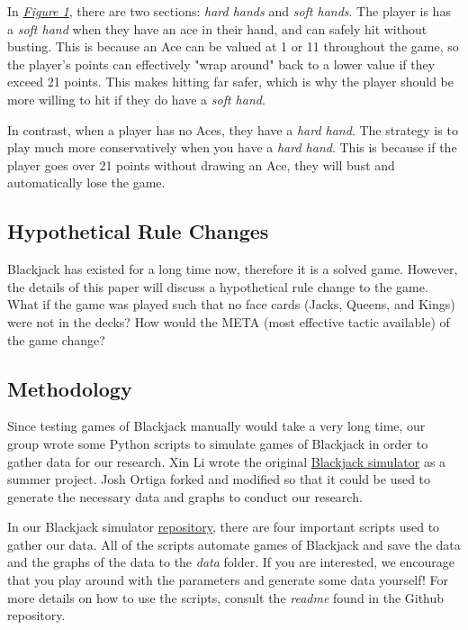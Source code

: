 \documentclass{article}
\begin{document}
		In \hyperlink{fig1}{\textit{Figure 1}}, there are two sections: \textit{hard hands} and \textit{soft hands}. The player is
		has a \textit{soft hand} when they have an ace in their hand, and can safely hit without busting. This is
		because an Ace can be valued at 1 or 11 throughout the game, so the player's points can effectively "wrap around"
		back to a lower value if they exceed 21 points. This makes hitting far safer, which is why the player should
		be more willing to hit if they do have a \textit{soft hand}.

		In contrast, when a player has no Aces, they have a \textit{hard hand}. The strategy is to play much 
		more conservatively when you have a \textit{hard hand}. This is because if the player goes over 21 points
		without drawing an Ace, they will bust and automatically lose the game.



	\subsection{Hypothetical Rule Changes}
	\label{sec: Hypothetical Rule Changes}

		Blackjack has existed for a long time now, therefore it is a solved game. However, the details of this paper will discuss a hypothetical rule
		change to the game. What if the game was played such that no face cards (Jacks, Queens, and Kings) were not in the decks? How would
		the META (most effective tactic available) of the game change?

	\subsection{Methodology}
	\label{sec: Methodology}
		
		Since testing games of Blackjack manually would take a very long time, our group wrote some Python scripts to simulate
		games of Blackjack in order to gather data for our research. Xin Li wrote the original \href{https://github.com/JDzzz7/Blackjack}{Blackjack simulator} as a summer project.
		Josh Ortiga forked and modified so that it could be used to generate the necessary data and graphs to conduct our research.

		In our Blackjack simulator \href{https://github.com/hosua/blackjack-cs241}{repository}, there are four important scripts
		used to gather our data. All of the scripts automate games of Blackjack and save the data and the graphs of the data to the \textit{data} folder.
		If you are interested, we encourage that you play around with the parameters and generate some data yourself! For more details on how to use the scripts,
		consult the \textit{readme} found in the Github repository.
		\newpage 
\end{document}
